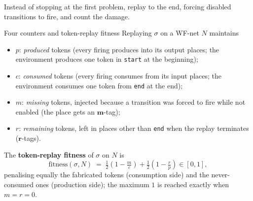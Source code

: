 Instead of stopping at the first problem, replay to the end, forcing disabled transitions to fire, and count the damage.
\begin{definitionbox}{Four counters and token-replay fitness}
Replaying $\sigma$ on a WF-net $N$ maintains
\begin{itemize}
  \item $p$: \emph{produced} tokens (every firing produces into its output places; the environment produces one token in \texttt{start} at the beginning);
  \item $c$: \emph{consumed} tokens (every firing consumes from its input places; the environment consumes one token from \texttt{end} at the end);
  \item $m$: \emph{missing} tokens, injected because a transition was forced to fire while not enabled (the place gets an $\mathbf{m}$-tag);
  \item $r$: \emph{remaining} tokens, left in places other than \texttt{end} when the replay terminates ($\mathbf{r}$-tags).
\end{itemize}
The \textbf{token-replay fitness} of $\sigma$ on $N$ is
\[\text{fitness}(\sigma, N) \;=\; \tfrac{1}{2}\!\left(1 - \tfrac{m}{c}\right) + \tfrac{1}{2}\!\left(1 - \tfrac{r}{p}\right) \in [0,1],\]
penalising equally the fabricated tokens (consumption side) and the never-consumed ones (production side); the maximum $1$ is reached exactly when $m = r = 0$.
\end{definitionbox}

